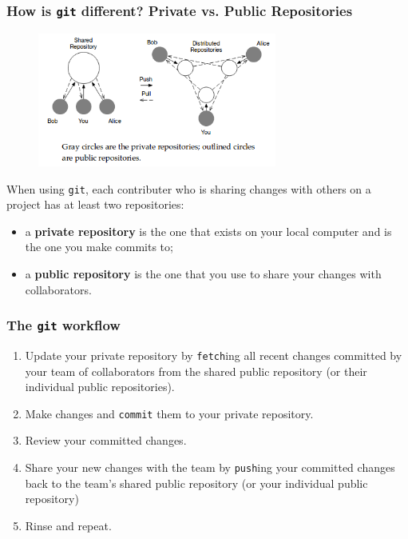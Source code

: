 \documentclass{beamer}
\begin{document}
\begin{frame}
   \frametitle{How is \texttt{git} different? Private vs. Public Repositories}
   \begin{figure}[htbp]
      \includegraphics[width=0.7\textwidth]{images/shared-vs-distributed-repository-layout.png}
   \end{figure}
   \vspace{-1.0em}
   When using \texttt{git}, each contributer who is sharing changes with
   others on a project has at least two repositories: \\
   \begin{itemize}
      \setlength\itemsep{0.5em}
      \item a \textbf{private repository} is the one that exists on your 
         local computer and is the one you make commits to;
      \item a \textbf{public repository} is the one that you use to 
         share your changes with collaborators.
   \end{itemize}
\end{frame}

\begin{frame}
   \frametitle{The \texttt{git} workflow}
   \begin{enumerate}\setlength\itemsep{1.0em}
      \item Update your private repository by \texttt{fetch}ing all recent 
         changes committed by your team of collaborators from the shared 
         public repository (or their individual public repositories).
      \item Make changes and \texttt{commit} them to your private repository.
      \item Review your committed changes.
      \item Share your new changes with the team by \texttt{push}ing your 
         committed changes back to the team's shared public repository 
         (or your individual public repository)
      \item Rinse and repeat. 
   \end{enumerate}
\end{frame}
\end{document}

